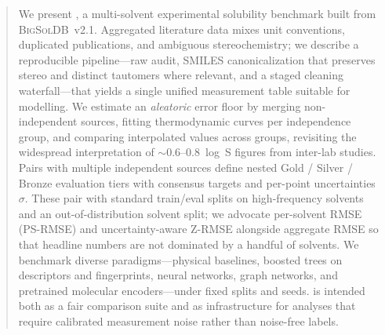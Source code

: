 \begin{abstract}
We present \scthree{}, a multi-solvent experimental solubility benchmark built from \textsc{BigSolDB}~v2.1.
Aggregated literature data mixes unit conventions, duplicated publications, and ambiguous stereochemistry; we describe a reproducible pipeline---raw audit, SMILES canonicalization that preserves stereo and distinct tautomers where relevant, and a staged cleaning waterfall---that yields a single unified measurement table suitable for modelling.
We estimate an \emph{aleatoric} error floor by merging non-independent sources, fitting thermodynamic curves per independence group, and comparing interpolated values across groups, revisiting the widespread interpretation of $\sim\!0.6$--$0.8$~log~S figures from inter-lab studies.
Pairs with multiple independent sources define nested Gold / Silver / Bronze evaluation tiers with consensus targets and per-point uncertainties~$\sigma$.
These pair with standard train/eval splits on high-frequency solvents and an out-of-distribution solvent split; we advocate per-solvent RMSE (PS-RMSE) and uncertainty-aware Z-RMSE alongside aggregate RMSE so that headline numbers are not dominated by a handful of solvents.
We benchmark diverse paradigms---physical baselines, boosted trees on descriptors and fingerprints, neural networks, graph networks, and pretrained molecular encoders---under fixed splits and seeds.
\scthree{} is intended both as a fair comparison suite and as infrastructure for analyses that require calibrated measurement noise rather than noise-free labels.
\end{abstract}
